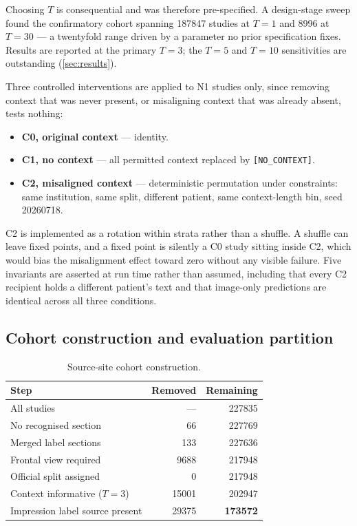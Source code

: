Choosing $T$ is consequential and was therefore pre-specified. A design-stage
sweep found the confirmatory cohort spanning \num{187847} studies at $T=1$ and
\num{8996} at $T=30$ --- a twentyfold range driven by a parameter no prior
specification fixes. Results are reported at the primary $T=3$; the $T=5$ and
$T=10$ sensitivities are outstanding (\cref{sec:results}).

Three controlled interventions are applied to N1 studies only, since removing
context that was never present, or misaligning context that was already absent,
tests nothing:

\begin{itemize}
  \item \textbf{C0, original context} --- identity.
  \item \textbf{C1, no context} --- all permitted context replaced by
    \texttt{[NO\_CONTEXT]}.
  \item \textbf{C2, misaligned context} --- deterministic permutation under
    constraints: same institution, same split, different patient, same
    context-length bin, seed \num{20260718}.
\end{itemize}

C2 is implemented as a rotation within strata rather than a shuffle. A shuffle
can leave fixed points, and a fixed point is silently a C0 study sitting inside
C2, which would bias the misalignment effect toward zero without any visible
failure. Five invariants are asserted at run time rather than assumed, including
that every C2 recipient holds a different patient's text and that image-only
predictions are identical across all three conditions.

\subsection{Cohort construction and evaluation partition}

\begin{table}[htbp]
\centering
\caption{Source-site cohort construction.}
\label{tab:cohort}
\begin{tabular}{lrr}
\toprule
Step & Removed & Remaining \\
\midrule
All studies                      & ---          & \num{227835} \\
No recognised section            & \num{66}     & \num{227769} \\
Merged label sections            & \num{133}    & \num{227636} \\
Frontal view required            & \num{9688}   & \num{217948} \\
Official split assigned          & \num{0}      & \num{217948} \\
Context informative ($T=3$)      & \num{15001}  & \num{202947} \\
Impression label source present  & \num{29375}  & \textbf{\num{173572}} \\
\bottomrule
\end{tabular}
\end{table}

